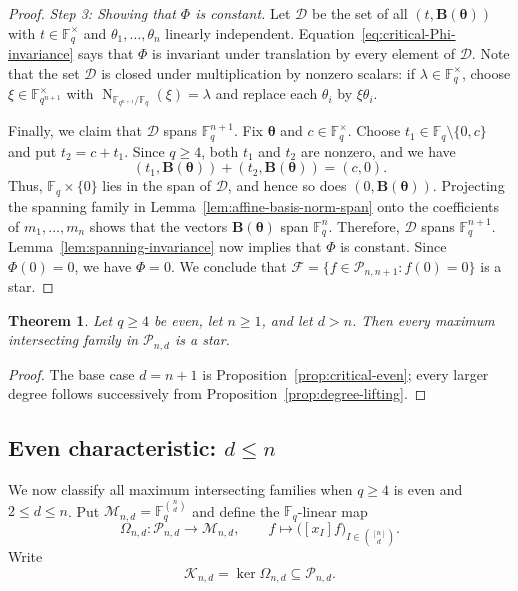\documentclass[12pt,reqno]{amsart}
\newtheorem{thm}{Theorem}[section]
\theoremstyle{definition}
\newcommand{\Nm}{\operatorname{N}}
\newcommand{\F}{\mathbb{F}}
\newcommand{\cD}{\mathcal D}
\newcommand{\cF}{\mathcal F}
\newcommand{\cP}{\mathcal P}
\newcommand{\cM}{\mathcal M}
\begin{document}
\begin{proof}
\smallskip
\noindent \emph{Step 3: Showing that $\Phi$ is constant.} Let $\cD$ be the set of all $(t,\mathbf B(\boldsymbol\theta))$ with $t\in\F_q^\times$ and
$\theta_1,\ldots,\theta_n$ linearly independent. Equation~\eqref{eq:critical-Phi-invariance} says that $\Phi$ is invariant under translation by every element of $\cD$. Note that the set $\cD$ is closed under multiplication by nonzero scalars: if $\lambda\in\F_q^\times$, choose $\xi\in\F_{q^{n+1}}^\times$ with $\Nm_{\F_{q^{n+1}}/\F_q}(\xi)=\lambda$ and replace each $\theta_i$ by $\xi\theta_i$.

Finally, we claim that $\cD$ spans $\F_q^{n+1}$. Fix $\boldsymbol\theta$ and $c\in\F_q^\times$. Choose
$t_1\in\F_q\setminus\{0,c\}$ and put $t_2=c+t_1$. Since $q\geq4$,
both $t_1$ and $t_2$ are nonzero, and we have
\[
(t_1,\mathbf B(\boldsymbol\theta))+(t_2,\mathbf B(\boldsymbol\theta))=(c,0).
\]
Thus, $\F_q\times\{0\}$ lies in the span of $\cD$, and hence so does $(0,\mathbf B(\boldsymbol\theta))$. Projecting the spanning family in Lemma~\ref{lem:affine-basis-norm-span}
onto the coefficients of $m_1,\ldots,m_n$ shows that the vectors $\mathbf B(\boldsymbol\theta)$ span $\F_q^n$. Therefore, $\cD$ spans $\F_q^{n+1}$. Lemma~\ref{lem:spanning-invariance} now implies that $\Phi$ is constant. Since $\Phi(0)=0$, we have $\Phi=0$. We conclude that $\cF = \{f\in\cP_{n,n+1}:f(0)=0\}$ is a star.
\end{proof}

\begin{thm}
\label{thm:even-supercritical}
Let $q\geq4$ be even, let $n\geq1$, and let $d>n$. Then every maximum intersecting family in $\cP_{n,d}$ is a star.
\end{thm}

\begin{proof}
The base case $d=n+1$ is Proposition~\ref{prop:critical-even}; every larger degree follows successively from
Proposition~\ref{prop:degree-lifting}.
\end{proof}

\subsection{Even characteristic: \texorpdfstring{$d\leq n$}{d <= n}}
\label{sec:even-exceptional-classification}

We now classify all maximum intersecting families when $q\geq4$ is even and $2\leq d\leq n$. Put $\cM_{n,d}=\F_q^{\binom{n}{d}}$ and define the $\F_q$-linear map
\[  
\Omega_{n,d} \colon \cP_{n,d}\to\cM_{n,d},
  \qquad f \mapsto \bigl([x_I]f\bigr)_{I\in\binom{[n]}{d}}.
\]
Write
\[
\mathcal K_{n,d}=\ker\Omega_{n,d} \subseteq \cP_{n,d}.
\]
\end{document}
